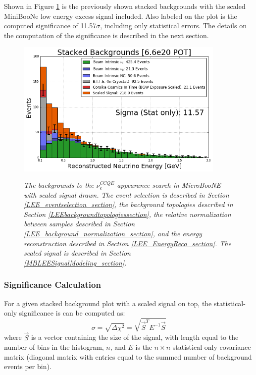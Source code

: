 Shown in Figure \ref{LEE_perfectreco_fullstack_fig} is the previously shown stacked backgrounds with the scaled MiniBooNe low energy excess signal included. Also labeled on the plot is the computed significance of 11.57$\sigma$, including only statistical errors. The details on the computation of the significance is described in the next section.

\begin{figure}[ht!]
\centering
\includegraphics[width=0.9\textwidth]{Figures/LEE_perfectreco_fullstack_WithAnalysisCuts.png}\\
\caption{\textit{The backgrounds to the $\nu_e^{CCQE}$ appearance search in MicroBooNE with scaled signal drawn. The event selection is described in Section \ref{LEE_eventselection_section}, the background topologies described in Section \ref{LEEbackgroundtopologiessection}, the relative normalization between samples described in Section \ref{LEE_background_normalization_section}, and the energy reconstruction described in Section \ref{LEE_EnergyReco_section}. The scaled signal is described in Section \ref{MBLEESignalModeling_section}.}}
\label{LEE_perfectreco_fullstack_fig}
\end{figure}

\subsubsection{Significance Calculation}
For a given stacked background plot with a scaled signal on top, the statistical-only significance is can be computed as:
\begin{equation}\label{chisquaresigeqtn}
\sigma = \sqrt{\Delta \chi^2} = \sqrt{\vec{S}^TE^{-1}\vec{S}}
\end{equation}
where $\vec{S}$ is a vector containing the size of the signal, with length equal to the number of bins in the histogram, $n$, and $E$ is the $n\times n$ statistical-only covariance matrix (diagonal matrix with entries equal to the summed number of background events per bin).


